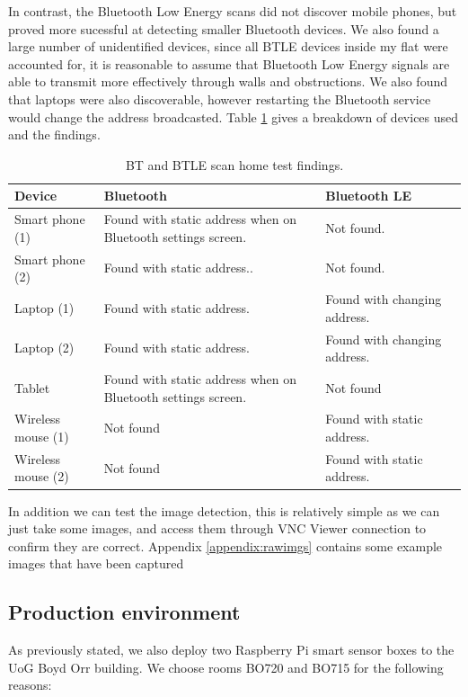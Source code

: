 \documentclass{l4proj}
\begin{document}
In contrast, the Bluetooth Low Energy scans did not discover mobile phones, but proved more sucessful at detecting smaller Bluetooth devices. We also found a large number of unidentified devices, since all BTLE devices inside my flat were accounted for, it is reasonable to assume that Bluetooth Low Energy signals are able to transmit more effectively through walls and obstructions. We also found that laptops were also discoverable, however restarting the Bluetooth service would change the address broadcasted. Table \ref{table:evalscan} gives a breakdown of devices used and the findings. 

\begin{table}
\begin{tabularx}{\textwidth}{|X|X|X|X|}
\hline
\textbf{Device} & \textbf{Bluetooth} & \textbf{Bluetooth LE} \tabularnewline
\hline
Smart phone (1) & Found with static address when on Bluetooth settings screen. & Not found. \\
\hline
Smart phone (2) & Found with static address.. & Not found. \\
\hline
Laptop (1) & Found with static address. & Found with changing address. \\
\hline
Laptop (2) & Found with static address. & Found with changing address. \\
\hline
Tablet & Found with static address when on Bluetooth settings screen. & Not found \\
\hline
Wireless mouse (1) & Not found & Found with static address. \\
\hline
Wireless mouse (2) & Not found & Found with static address. \\
\hline
\end{tabularx}
\caption{BT and BTLE scan home test findings.}
\label{table:evalscan}
\end{table}

In addition we can test the image detection, this is relatively simple as we can just take some images, and access them through VNC Viewer connection to confirm they are correct. Appendix \ref{appendix:rawimgs} contains some example images that have been captured

\subsection{Production environment}

As previously stated, we also deploy two Raspberry Pi smart sensor boxes to the UoG Boyd Orr building. We choose rooms BO720 and BO715 for the following reasons:
\end{document}
